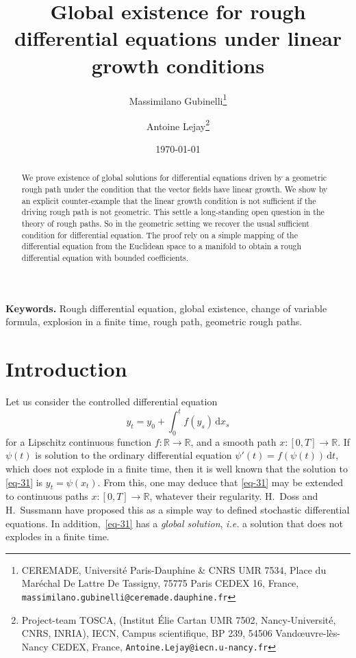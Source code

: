 \documentclass[a4paper,12pt]{article}
\theoremstyle{definition}
\newcommand{\vd}{\,\mathrm{d}}
\newcommand{\RR}{\mathbb{R}}
\begin{document}
\title{Global existence for rough differential
equations under linear growth conditions}

\author{Massimilano Gubinelli\footnote{CEREMADE, Université Paris-Dauphine \& CNRS UMR 7534, 
Place du Maréchal De Lattre De Tassigny,
75775 Paris CEDEX 16, France, 
\texttt{massimilano.gubinelli@ceremade.dauphine.fr}}
\and Antoine Lejay\footnote{Project-team TOSCA, 
(Institut \'Elie Cartan UMR 7502,
Nancy-Universit\'e, CNRS, INRIA), IECN, Campus scientifique, BP 239, 
54506 Vand\oe uvre-l\`es-Nancy CEDEX, France,
\texttt{Antoine.Lejay@iecn.u-nancy.fr}}}


\date{\today}

\maketitle

\begin{abstract}
We prove existence of global solutions for differential equations 
driven by
a geometric rough path under the condition that the vector fields have linear growth. We show by an explicit counter-example that the linear growth condition is not sufficient if the driving rough path is not geometric.  This settle a long-standing open question in the theory of rough paths. So in the geometric setting we recover the usual sufficient condition for differential equation. The proof rely on a simple mapping of the differential equation from the Euclidean space to a manifold to obtain a rough differential equation with bounded coefficients. 
\end{abstract}

\noindent\textbf{Keywords.} Rough differential equation, global existence, change of variable formula, 
explosion in a finite time, rough path, geometric rough paths.

\section{Introduction}

Let us consider the controlled differential equation 
\begin{equation}
\label{eq-31}
y_t=y_0+\int_0^t f(y_s)\vd x_s
\end{equation}
for a Lipschitz continuous function $f:\RR\to\RR$, and a smooth path $x:[0,T]\to\RR$.
If $\psi(t)$ is solution to the ordinary differential equation
$\psi'(t)=f(\psi(t))\vd t$, which does not explode in a finite time, then it is well known that 
the solution to \eqref{eq-31} is $y_t=\psi(x_t)$. From this, 
one may deduce that \eqref{eq-31} may be extended to continuous paths $x:[0,T]\to\RR$, 
whatever their regularity. H.~Doss \cite{doss77a} and H.~Sussmann \cite{sussmann78a} have proposed 
this as a simple way to defined stochastic differential equations.
In addition,~\eqref{eq-31} has a \emph{global solution}, \textit{i.e.} a solution that
does not explodes in a finite time.
\end{document}
